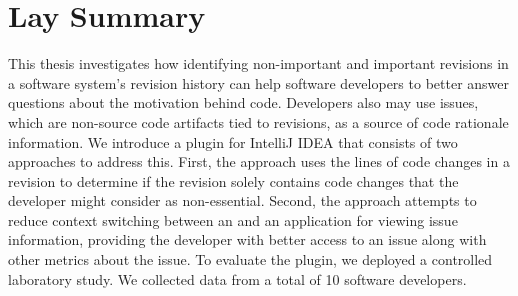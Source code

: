 

\chapter{Lay Summary}

This thesis investigates how identifying non-important and important 
revisions in a software system's revision history can help 
software developers to better answer questions about the motivation behind code.
Developers also may use issues, which are non-source code artifacts tied to revisions, 
as a source of code rationale information.
We introduce a plugin for IntelliJ IDEA that consists of two approaches to address this.
First, the approach uses the lines of code changes in a revision
to determine if the revision solely contains code changes that the developer
might consider as non-essential.
Second, the approach attempts to reduce context switching between an 
and an application for viewing issue information, providing the developer with
better access to an issue along with other metrics about the issue.
To evaluate the plugin, we deployed a controlled laboratory study.
We collected data from a total of 10 software developers.